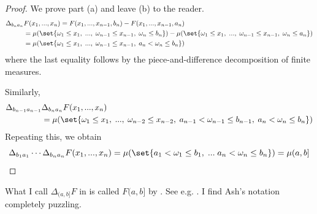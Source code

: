 \documentclass{article} %
\begin{document}
\begin{proof}
We prove part (a) and leave (b) to the reader.
\begin{align*}
\Delta_{b_na_n} &F(x_1, ..., x_n) = 	F(x_1,...,x_{n-1}, b_n) - F(x_1,...,x_{n-1}, a_n)\\
&=\mu(\set{\omega_1 \leq x_1, \; ..., \; \omega_{n-1} \leq x_{n-1}, \; \omega_{n} \leq b_{n}}) - \mu(\set{\omega_1 \leq x_1, \; ..., \; \omega_{n-1} \leq x_{n-1}, \;\omega_{n} \leq a_{n}}) \\
&=\mu(\set{\omega_1 \leq x_1, \; ..., \; \omega_{n-1} \leq x_{n-1}, \; a_n < \omega_{n} \leq b_{n}})
\end{align*}
where the last equality follows by the piece-and-difference decomposition of finite measures.

Similarly, 
\begin{align*}
\Delta_{b_{n-1}a_{n-1}} &\Delta_{b_na_n} F(x_1, ..., x_n) \\
&=\mu(\set{\omega_1 \leq x_1, \;..., \; \omega_{n-2} \leq x_{n-2}, \; a_{n-1} < \omega_{n-1} \leq b_{n-1}, \; a_n < \omega_{n} \leq b_{n}})
\end{align*}
Repeating this, we obtain
\[\Delta_{b_1a_1} \cdots \Delta_{b_na_n} F(x_1, ..., x_n) =  \mu(\set{a_1 < \omega_1 \leq b_1, \; ... \; a_n < \omega_{n} \leq b_{n}}) = \mu(a,b]\]

\end{proof}

\begin{notation}
What I call $\Delta_{(a,b]} F$ in  is called $F(a,b]$ by \cite{ash2000probability}.  See e.g. \cite[pp.28, or pp.149]{ash2000probability}.  I find Ash's notation completely puzzling.
\label{notation:ash_notation_for_multivariate_distribution_function_applied_to_an_rsc_interval}
\end{notation}
\end{document}
